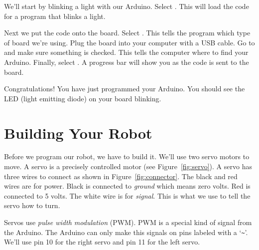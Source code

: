 \documentclass[letterpaper]{article}
\begin{document}
We'll start by blinking a light with our Arduino.
Select .
This will load the code for a program that blinks a light.

Next we put the code onto the board.
Select .
This tells the program which type of board we're using.
Plug the board into your computer with a USB cable.
Go to  and make sure something is checked.
This tells the computer where to find your Arduino.
Finally, select .
A progress bar will show you as the code is sent to the board.

Congratulations!
You have just programmed your Arduino.
You should see the LED (light emitting diode) on your board blinking.

\section{Building Your Robot}
\label{sec:wiring_your_robot}

Before we program our robot, we have to build it.
We'll use two servo motors to move.
A servo is a precisely controlled motor (see Figure~\ref{fig:servo}).
A servo has three wires to connect as shown in Figure~\ref{fig:connector}.
The black and red wires are for power.
Black is connected to \emph{ground} which means zero volts.
Red is connected to 5 volts.
The white wire is for \emph{signal}.
This is what we use to tell the servo how to turn.

Servos use \emph{pulse width modulation} (PWM).
PWM is a special kind of signal from the Arduino.
The Arduino can only make this signals on pins
labeled with a `\texttt{\textasciitilde}'.
We'll use pin 10 for the right servo
and pin 11 for the left servo.
\end{document}

